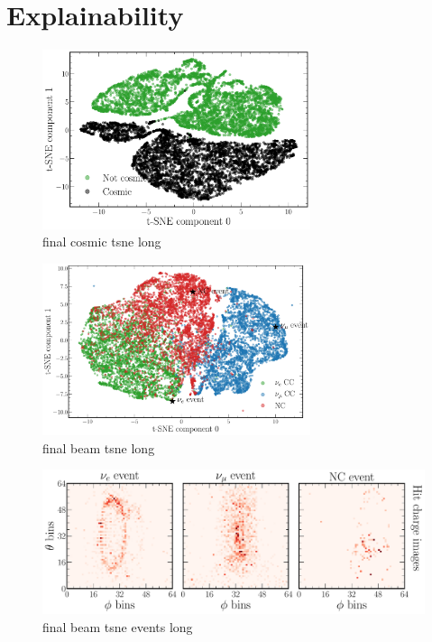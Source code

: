 \section{Explainability} %
\label{sec:cvn_explain} %

\begin{figure} %
    \includegraphics[width=0.7\textwidth]{diagrams/6-cvn/chipsnet/final_cosmic_tsne.pdf}
    \caption[final cosmic tsne short]
    {final cosmic tsne long}
    \label{fig:final_cosmic_tsne}
\end{figure}

\begin{figure} %
    \includegraphics[width=0.7\textwidth]{diagrams/6-cvn/chipsnet/final_beam_tsne.pdf}
    \caption[final beam tsne short]
    {final beam tsne long}
    \label{fig:final_beam_tsne}
\end{figure}

\begin{figure} %
    \includegraphics[width=\textwidth]{diagrams/6-cvn/chipsnet/final_beam_tsne_events.pdf}
    \caption[final beam tsne events short]
    {final beam tsne events long}
    \label{fig:final_beam_tsne_events}
\end{figure}

